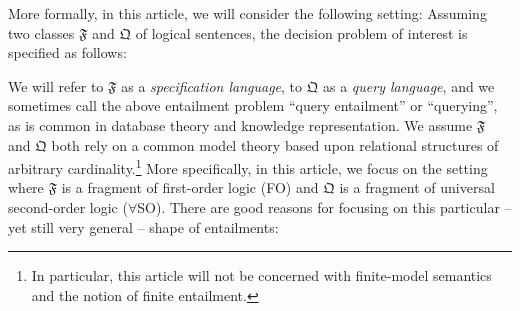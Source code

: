 More formally, in this article, we will consider the following setting: Assuming two classes $\mathfrak{F}$ and $\mathfrak{Q}$ of logical sentences, the decision problem of interest is specified as follows:

\bigskip


\bigskip

\noindent
We will refer to $\mathfrak{F}$ as a \emph{specification language}, to $\mathfrak{Q}$ as a \emph{query language}, and we sometimes call the above entailment problem ``query entailment'' or %
 ``querying'', as is common in database theory and knowledge representation. We assume $\mathfrak{F}$ and $\mathfrak{Q}$ both rely on a common model theory based upon relational structures of arbitrary cardinality.\footnote{In particular, this article will not be concerned with finite-model semantics and the notion of finite entailment.} 
 More specifically, in this article, we focus on the setting where $\mathfrak{F}$ is a fragment of first-order logic (FO) and $\mathfrak{Q}$ is a fragment of universal second-order logic ($\forall$SO). There are good reasons for focusing on this particular -- yet still very %
 general -- shape of entailments:

